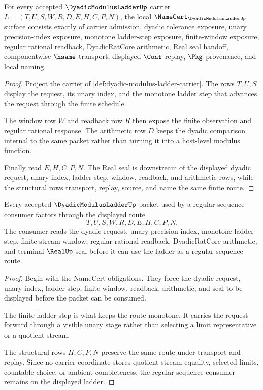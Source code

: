\begin{theorem}
\label{thm:dyadic-modulus-ladder-namecert-obligations}
For every accepted $\DyadicModulusLadderUp$ carrier $L=(T,U,S,W,R,D,E,H,C,P,N)$, the local $\NameCert_{\DyadicModulusLadderUp}$ surface consists exactly of carrier admission, dyadic tolerance exposure, unary precision-index exposure, monotone ladder-step exposure, finite-window exposure, regular rational readback, DyadicRatCore arithmetic, Real seal handoff, componentwise $\hsame$ transport, displayed $\Cont$ replay, $\Pkg$ provenance, and local naming.
\end{theorem}
\begin{proof}
Project the carrier of \autoref{def:dyadic-modulus-ladder-carrier}. The rows $T,U,S$ display the request, its unary index, and the monotone ladder step that advances the request through the finite schedule.

The window row $W$ and readback row $R$ then expose the finite observation and regular rational response. The arithmetic row $D$ keeps the dyadic comparison internal to the same packet rather than turning it into a host-level modulus function.

Finally read $E,H,C,P,N$. The Real seal is downstream of the displayed dyadic request, unary index, ladder step, window, readback, and arithmetic rows, while the structural rows transport, replay, source, and name the same finite route.
\end{proof}

\begin{theorem}
\label{thm:dyadic-modulus-ladder-regular-sequence-route}
Every accepted $\DyadicModulusLadderUp$ packet used by a regular-sequence consumer factors through the displayed route
$$
T,U,S,W,R,D,E,H,C,P,N.
$$
The consumer reads the dyadic request, unary precision index, monotone ladder step, finite stream window, regular rational readback, DyadicRatCore arithmetic, and terminal $\RealUp$ seal before it can use the ladder as a regular-sequence route.
\end{theorem}
\begin{proof}
Begin with the NameCert obligations. They force the dyadic request, unary index, ladder step, finite window, readback, arithmetic, and seal to be displayed before the packet can be consumed.

The finite ladder step is what keeps the route monotone. It carries the request forward through a visible unary stage rather than selecting a limit representative or a quotient stream.

The structural rows $H,C,P,N$ preserve the same route under transport and replay. Since no carrier coordinate stores quotient stream equality, selected limits, countable choice, or ambient completeness, the regular-sequence consumer remains on the displayed ladder.
\end{proof}

